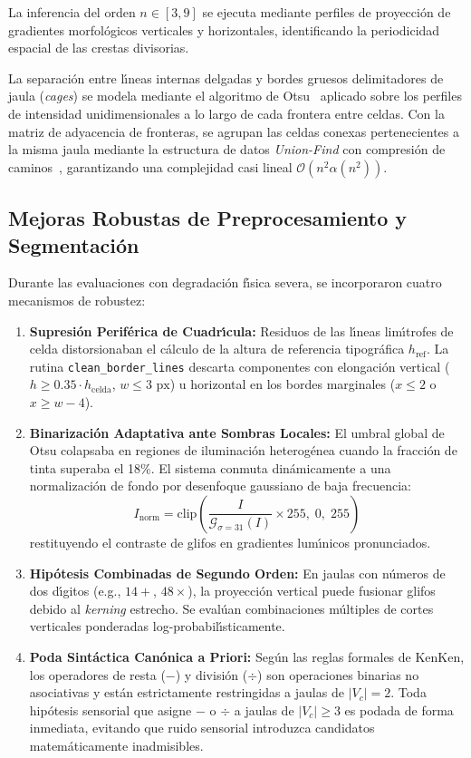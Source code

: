La inferencia del orden $n \in [3, 9]$ se ejecuta mediante perfiles de proyecci\'on de gradientes morfol\'ogicos verticales y horizontales, identificando la periodicidad espacial de las crestas divisorias.

La separaci\'on entre l\'{\i}neas internas delgadas y bordes gruesos delimitadores de jaula (\textit{cages}) se modela mediante el algoritmo de Otsu~\cite{otsu1979threshold} aplicado sobre los perfiles de intensidad unidimensionales a lo largo de cada frontera entre celdas. Con la matriz de adyacencia de fronteras, se agrupan las celdas conexas pertenecientes a la misma jaula mediante la estructura de datos \textit{Union-Find} con compresi\'on de caminos~\cite{tarjan1975efficiency}, garantizando una complejidad casi lineal $\mathcal{O}(n^2 \alpha(n^2))$.

\subsection{Mejoras Robustas de Preprocesamiento y Segmentaci\'on}
Durante las evaluaciones con degradaci\'on f\'{\i}sica severa, se incorporaron cuatro mecanismos de robustez:
\begin{enumerate}
    \item \textbf{Supresi\'on Perif\'erica de Cuadr\'{\i}cula:} Residuos de las l\'{\i}neas lim\'{\i}trofes de celda distorsionaban el c\'alculo de la altura de referencia tipogr\'afica $h_{\text{ref}}$. La rutina \texttt{clean\_border\_lines} descarta componentes con elongaci\'on vertical ($h \ge 0.35 \cdot h_{\text{celda}}$, $w \le 3\text{ px}$) u horizontal en los bordes marginales ($x \le 2$ o $x \ge w-4$).
    \item \textbf{Binarizaci\'on Adaptativa ante Sombras Locales:} El umbral global de Otsu colapsaba en regiones de iluminaci\'on heterog\'enea cuando la fracci\'on de tinta superaba el 18\%. El sistema conmuta din\'amicamente a una normalizaci\'on de fondo por desenfoque gaussiano de baja frecuencia:
    \begin{equation}
        I_{\text{norm}} = \text{clip}\left(\frac{I}{\mathcal{G}_{\sigma=31}(I)} \times 255, \; 0, \; 255\right)
    \end{equation}
    restituyendo el contraste de glifos en gradientes lum\'{\i}nicos pronunciados.
    \item \textbf{Hip\'otesis Combinadas de Segundo Orden:} En jaulas con n\'umeros de dos d\'{\i}gitos (e.g., $14+$, $48\times$), la proyecci\'on vertical puede fusionar glifos debido al \textit{kerning} estrecho. Se eval\'uan combinaciones m\'ultiples de cortes verticales ponderadas log-probabil\'{\i}sticamente.
    \item \textbf{Poda Sint\'actica Can\'onica a Priori:} Seg\'un las reglas formales de KenKen, los operadores de resta ($-$) y divisi\'on ($\div$) son operaciones binarias no asociativas y est\'an estrictamente restringidas a jaulas de $|V_c| = 2$. Toda hip\'otesis sensorial que asigne $-$ o $\div$ a jaulas de $|V_c| \ge 3$ es podada de forma inmediata, evitando que ruido sensorial introduzca candidatos matem\'aticamente inadmisibles.
\end{enumerate}

